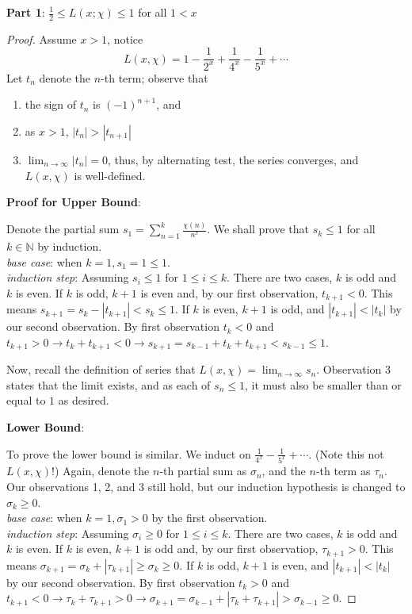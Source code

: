 \documentclass{article}
\theoremstyle{definition}
\theoremstyle{definition}
\theoremstyle{remark}
\newcommand{\bb}[1]{\mathbb{#1}} %
\begin{document}
{\large\textbf{Part 1}: $\frac{1}{2} \leq L(x; \chi) \leq 1$ for all $1 < x$}

\begin{proof}
	Assume $ x > 1$, notice 
	\begin{equation}
		L(x, \chi) = 1 - \frac{1}{2^x} + \frac{1}{4^x} - \frac{1}{5^x} + \cdots
	\end{equation}
	Let $t_n$ denote the $n$-th term; observe that 
	\begin{enumerate}
		\item the sign of $t_n$ is $(-1)^{n+1}$, and 
		\item as $x > 1$, $|t_n| > |t_{n+1}|$ \
		\item $\lim_{n \rightarrow \infty} |t_n| = 0$, thus, by alternating test, the series converges, and $L(x, \chi)$ is well-defined.
	\end{enumerate}

	\textbf{Proof for Upper Bound}:

	Denote the partial sum $s_1 = \sum_{n=1}^k \frac{\chi(n)}{n^x}$. 
	We shall prove that $s_k \leq 1$ for all $k \in \bb{N}$ by induction.\\
	\textit{base case}: when $k = 1, s_1 = 1 \leq 1$. \\ 
	\textit{induction step}: Assuming $s_i \leq 1$ for $1\leq i \leq k$.
	There are two cases, $k$ is odd and $k$ is even. 
	If $k$ is odd, $k+1$ is even and, by our first observation, $t_{k+1} < 0$. 
	This means $s_{k+1} = s_{k} - |t_{k+1}| < s_{k} \leq 1$.
	If $k$ is even, $k+1$ is odd, and $|t_{k+1}| < |t_{k}|$ by our second observation. 
	By first observation $t_k < 0$ and $t_{k+1} > 0 \rightarrow  t_{k} + t_{k+1} < 0 \rightarrow s_{k+1} = s_{k-1} + t_k + t_{k+1} < s_{k-1}\leq 1$.

	Now, recall the definition of series that $L(x, \chi) = \lim_{n \rightarrow \infty} s_n$. 
	Observation 3 states that the limit exists, and as each of $s_n \leq 1$, it must also be smaller than or equal to $1$ as desired.

	\textbf{Lower Bound}:

	To prove the lower bound is similar. 
	We induct on $\frac{1}{4^x} - \frac{1}{5^x} + \cdots$. (Note this not $L(x, \chi)$!)
	Again, denote the $n$-th partial sum as $\sigma_n$, and the $n$-th term as $\tau_n$. 
	Our observations 1, 2, and 3 still hold, but our induction hypothesis is changed to $\sigma_k \geq 0$.\\
	\textit{base case}: when $k = 1, \sigma_1 > 0$ by the first observation. \\ 
	\textit{induction step}: Assuming $\sigma_i \geq 0$ for $1\leq i \leq k$.
	There are two cases, $k$ is odd and $k$ is even. 
	If $k$ is even, $k+1$ is odd and, by our first observatiop, $\tau_{k+1} > 0$. 
	This means $\sigma_{k+1} = \sigma_{k} + |\tau_{k+1}| \geq \sigma_{k} \geq 0$.
	If $k$ is odd, $k+1$ is even, and $|t_{k+1}| < |t_{k}|$ by our second observation. 
	By first observation $t_k > 0$ and $t_{k+1} < 0 \rightarrow  \tau_{k} + \tau_{k+1} > 0 \rightarrow \sigma_{k+1} = \sigma_{k-1} + |\tau_k + \tau_{k+1}| > \sigma_{k-1} \geq 0$.


\end{proof}
\end{document}
